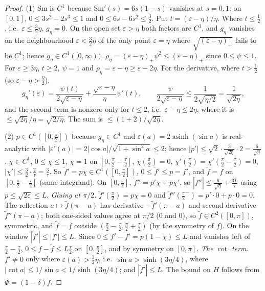 \begin{proof}
(1) $\mathrm{Sm}$ is $C^1$ because $\mathrm{Sm}'(s)=6s(1-s)$ vanishes at $s=0,1$; on $[0,1]$, $0\le3s^2-2s^3\le1$ and
$0\le6s-6s^2\le\frac32$. Put $t=(\varepsilon-\eta)/\eta$. Where $t\le\frac12$, i.e.\ $\varepsilon\le\frac32\eta$, $g_\eta=0$.
On the open set $\varepsilon>\eta$ both factors are $C^1$, and $g_\eta$ vanishes on the neighbourhood $\varepsilon<\frac32\eta$ of the
only point $\varepsilon=\eta$ where $\sqrt{(\varepsilon-\eta)_+}$ fails to be $C^1$; hence $g_\eta\in C^1([0,\infty))$.
$\rho_\eta=(\varepsilon-\eta)_+\psi^2\le(\varepsilon-\eta)_+$ since $0\le\psi\le1$. For $\varepsilon\ge3\eta$, $t\ge2$, $\psi=1$ and
$\rho_\eta=\varepsilon-\eta\ge\varepsilon-2\eta$. For the derivative, where $t>\frac12$ (so $\varepsilon-\eta>\frac\eta2$),
\[
g_\eta'(\varepsilon)=\frac{\psi(t)}{2\sqrt{\varepsilon-\eta}}+\frac{\sqrt{\varepsilon-\eta}}{\eta}\psi'(t),\qquad
\frac{\psi}{2\sqrt{\varepsilon-\eta}}\le\frac1{2\sqrt{\eta/2}}=\frac1{\sqrt{2\eta}},
\]
and the second term is nonzero only for $t\le2$, i.e.\ $\varepsilon-\eta\le2\eta$, where it is $\le\sqrt{2\eta}/\eta=\sqrt{2/\eta}$.
The sum is $\le(1+2)/\sqrt{2\eta}$.

(2) $p\in C^1([0,\frac\pi2])$ because $g_\eta\in C^1$ and $\varepsilon(a)=2\operatorname{asinh}(\sin a)$ is real-analytic with
$|\varepsilon'(a)|=2|\cos a|/\sqrt{1+\sin^2a}\le2$; hence $|p'|\le\sqrt2\cdot\frac3{\sqrt{2\eta}}\cdot2=\frac6{\sqrt\eta}$.
$\chi\in C^1$, $0\le\chi\le1$, $\chi=1$ on $[0,\frac\pi2-\frac\tau2]$, $\chi(\frac\pi2)=0$, $\chi'(\frac\pi2)=\chi'(\frac\pi2-\frac\tau2)=0$,
$|\chi'|\le\frac32\cdot\frac2\tau=\frac3\tau$. So $\tilde f'=p\chi\in C^1([0,\frac\pi2])$, $0\le\tilde f'\le p=f'$, and
$\tilde f=f$ on $[0,\frac\pi2-\frac\tau2]$ (same integrand). On $[0,\frac\pi2]$,
$\tilde f''=p'\chi+p\chi'$, so $|\tilde f''|\le\frac6{\sqrt\eta}+\frac{3L}\tau$ using $p\le\sqrt{2\varepsilon}\le L$.
\emph{Gluing at $\pi/2$.} $\tilde f'(\frac\pi2)=p\chi=0$ and $\tilde f''(\frac\pi2^-)=p'\cdot0+p\cdot0=0$. The reflection
$a\mapsto\tilde f(\pi-a)$ has derivative $-\tilde f'(\pi-a)$ and second derivative $\tilde f''(\pi-a)$; both one-sided values
agree at $\pi/2$ ($0$ and $0$), so $\tilde f\in C^2([0,\pi])$, symmetric, and $\tilde f=f$ outside
$(\frac\pi2-\frac\tau2,\frac\pi2+\frac\tau2)$ (by the symmetry of $f$). On the window $|\tilde f'|\le|f'|\le L$. Since
$0\le f'-\tilde f'=p(1-\chi)\le L$ and vanishes left of $\frac\pi2-\frac\tau2$, $0\le f-\tilde f\le L\frac\tau2$ on $[0,\frac\pi2]$, and by
symmetry on $[0,\pi]$. \emph{The $\cot$ term.} $\tilde f'\ne0$ only where $\varepsilon(a)>\frac32\eta$, i.e.\
$\sin a>\sinh(3\eta/4)$, where $|\cot a|\le1/\sin a<1/\sinh(3\eta/4)$; and $|\tilde f'|\le L$. The bound on $H$ follows
from $\Phi=(1-\delta)\tilde f$.
\end{proof}

